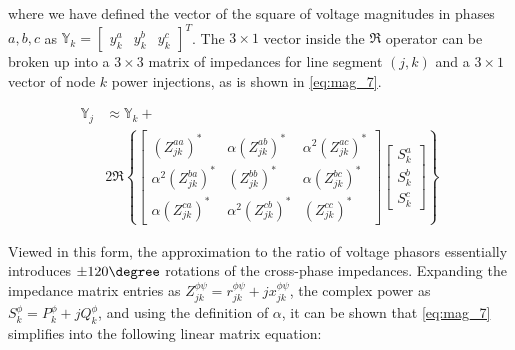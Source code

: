 \noindent  where we have defined the vector of the square of voltage magnitudes in phases $a,b,c$ as $\mathbb{Y}_{k} = \begin{bmatrix} y_{k}^{a} & y_{k}^{b} & y_{k}^{c} \end{bmatrix}^{T}$.  The $3 \times 1$ vector inside the $\Re$ operator can be broken up into a $3 \times 3$ matrix of impedances for line segment $(j,k)$ and a $3 \times 1$ vector of node $k$ power injections, as is shown in \eqref{eq:mag_7}.


\begin{align}
	\mathbb{Y}_{j} &\approx \mathbb{Y}_{k} + \nonumber \\
    &2 \Re \left\{
    \begin{bmatrix}
    	(Z_{jk}^{aa})^{*} & \alpha (Z_{jk}^{ab})^{*} & \alpha^{2} (Z_{jk}^{ac})^{*} \\
    	\alpha^{2} (Z_{jk}^{ba})^{*} & (Z_{jk}^{bb})^{*} & \alpha (Z_{jk}^{bc})^{*} \\
    	\alpha (Z_{jk}^{ca})^{*} & \alpha^{2} (Z_{jk}^{cb})^{*} & (Z_{jk}^{cc})^{*}
    \end{bmatrix}
    \begin{bmatrix}
    	S_{k}^{a} \\ S_{k}^{b} \\ S_{k}^{c}
    \end{bmatrix}
	\right\}
    \label{eq:mag_7}
\end{align}

Viewed in this form, the approximation to the ratio of voltage phasors essentially introduces $\pm 120 \degree$ rotations of the cross-phase impedances. Expanding the impedance matrix entries as $Z_{jk}^{\phi \psi} = r_{jk}^{\phi \psi} + j x_{jk}^{\phi \psi}$, the complex power as $S_{k}^{\phi} = P_{k}^{\phi} + j Q_{k}^{\phi}$, and using the definition of $\alpha$, it can be shown that \eqref{eq:mag_7} simplifies into the following linear matrix equation:

